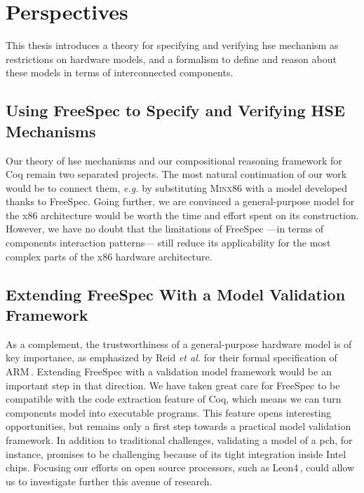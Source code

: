 \section{Perspectives}
\label{sec:conclusion:perspectives}

This thesis introduces a theory for specifying and verifying \ac{hse} mechanism as
restrictions on hardware models, and a formalism to define and reason about
these models in terms of interconnected components.

\subsection*{Using FreeSpec to Specify and Verifying HSE Mechanisms}
%
Our theory of \ac{hse} mechanisms and our compositional reasoning framework for
Coq remain two separated projects.
%
The most natural continuation of our work would be to connect them, \emph{e.g.}
by substituting {\scshape Minx86} with a model developed thanks to FreeSpec.
%
Going further, we are convinced a general-purpose model for the x86 architecture
would be worth the time and effort spent on its construction.
%
However, we have no doubt that the limitations of FreeSpec ---in terms of
components interaction patterns--- still reduce its applicability for the most
complex parts of the x86 hardware architecture.

\subsection*{Extending FreeSpec With a Model Validation Framework}
%
As a complement, the trustworthiness of a general-purpose hardware model is of
key importance, as emphasized by Reid \emph{et al.} for their formal
specification of ARM\,\cite{reid2016armv8}.
%
Extending FreeSpec with a validation model framework would be an important step
in that direction.
%
We have taken great care for FreeSpec to be compatible with the code extraction
feature of Coq, which means we can turn components model into executable
programs.
%
This feature opens interesting opportunities, but remains only a first step
towards a practical model validation framework.
%
In addition to traditional challenges, validating a model of a \ac{pch}, for
instance, promises to be challenging because of its tight integration inside
Intel chips.
%
Focusing our efforts on open source processors, such as
Leon4\,\cite{gaisler2007leon}, could allow us to investigate further this avenue
of research.
